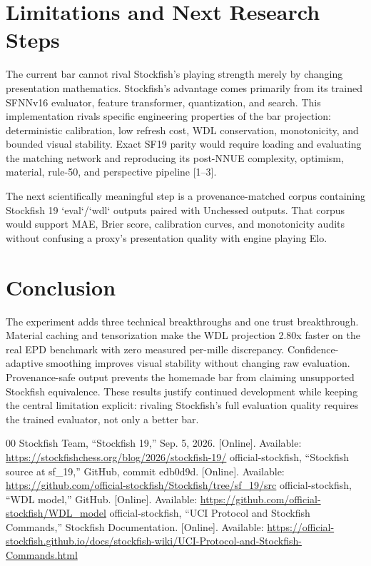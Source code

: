 \documentclass[10pt,conference]{IEEEtran}
\begin{document}
\section{Limitations and Next Research Steps}
The current bar cannot rival Stockfish's playing strength merely by changing presentation mathematics. Stockfish's advantage comes primarily from its trained SFNNv16 evaluator, feature transformer, quantization, and search. This implementation rivals specific engineering properties of the bar projection: deterministic calibration, low refresh cost, WDL conservation, monotonicity, and bounded visual stability. Exact SF19 parity would require loading and evaluating the matching network and reproducing its post-NNUE complexity, optimism, material, rule-50, and perspective pipeline [1--3].

The next scientifically meaningful step is a provenance-matched corpus containing Stockfish 19 `eval`/`wdl` outputs paired with Unchessed outputs. That corpus would support MAE, Brier score, calibration curves, and monotonicity audits without confusing a proxy's presentation quality with engine playing Elo.

\section{Conclusion}
The experiment adds three technical breakthroughs and one trust breakthrough. Material caching and tensorization make the WDL projection 2.80x faster on the real EPD benchmark with zero measured per-mille discrepancy. Confidence-adaptive smoothing improves visual stability without changing raw evaluation. Provenance-safe output prevents the homemade bar from claiming unsupported Stockfish equivalence. These results justify continued development while keeping the central limitation explicit: rivaling Stockfish's full evaluation quality requires the trained evaluator, not only a better bar.

\begin{thebibliography}{00}
 Stockfish Team, ``Stockfish 19,'' Sep. 5, 2026. [Online]. Available: \url{https://stockfishchess.org/blog/2026/stockfish-19/}
 official-stockfish, ``Stockfish source at sf\_19,'' GitHub, commit edb0d9d. [Online]. Available: \url{https://github.com/official-stockfish/Stockfish/tree/sf_19/src}
 official-stockfish, ``WDL model,'' GitHub. [Online]. Available: \url{https://github.com/official-stockfish/WDL_model}
 official-stockfish, ``UCI Protocol and Stockfish Commands,'' Stockfish Documentation. [Online]. Available: \url{https://official-stockfish.github.io/docs/stockfish-wiki/UCI-Protocol-and-Stockfish-Commands.html}
\end{thebibliography}
\end{document}
